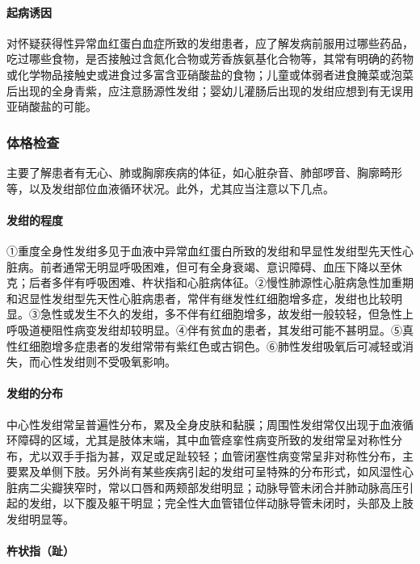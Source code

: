 \paragraph{起病诱因}

对怀疑获得性异常血红蛋白血症所致的发绀患者，应了解发病前服用过哪些药品，吃过哪些食物，是否接触过含氮化合物或芳香族氨基化合物等，其常有明确的药物或化学物品接触史或进食过多富含亚硝酸盐的食物；儿童或体弱者进食腌菜或泡菜后出现的全身青紫，应注意肠源性发绀；婴幼儿灌肠后出现的发绀应想到有无误用亚硝酸盐的可能。

\subsubsection{体格检查}

主要了解患者有无心、肺或胸廓疾病的体征，如心脏杂音、肺部啰音、胸廓畸形等，以及发绀部位血液循环状况。此外，尤其应当注意以下几点。

\paragraph{发绀的程度}

①重度全身性发绀多见于血液中异常血红蛋白所致的发绀和早显性发绀型先天性心脏病。前者通常无明显呼吸困难，但可有全身衰竭、意识障碍、血压下降以至休克；后者多伴有呼吸困难、杵状指和心脏病体征。②慢性肺源性心脏病急性加重期和迟显性发绀型先天性心脏病患者，常伴有继发性红细胞增多症，发绀也比较明显。③急性或发生不久的发绀，多不伴有红细胞增多，故发绀一般较轻，但急性上呼吸道梗阻性病变发绀却较明显。④伴有贫血的患者，其发绀可能不甚明显。⑤真性红细胞增多症患者的发绀常带有紫红色或古铜色。⑥肺性发绀吸氧后可减轻或消失，而心性发绀则不受吸氧影响。

\paragraph{发绀的分布}

中心性发绀常呈普遍性分布，累及全身皮肤和黏膜；周围性发绀常仅出现于血液循环障碍的区域，尤其是肢体末端，其中血管痉挛性病变所致的发绀常呈对称性分布，尤以双手手指为甚，双足或足趾较轻；血管闭塞性病变常呈非对称性分布，主要累及单侧下肢。另外尚有某些疾病引起的发绀可呈特殊的分布形式，如风湿性心脏病二尖瓣狭窄时，常以口唇和两颊部发绀明显；动脉导管未闭合并肺动脉高压引起的发绀，以下腹及躯干明显；完全性大血管错位伴动脉导管未闭时，头部及上肢发绀明显等。

\paragraph{杵状指（趾）}

